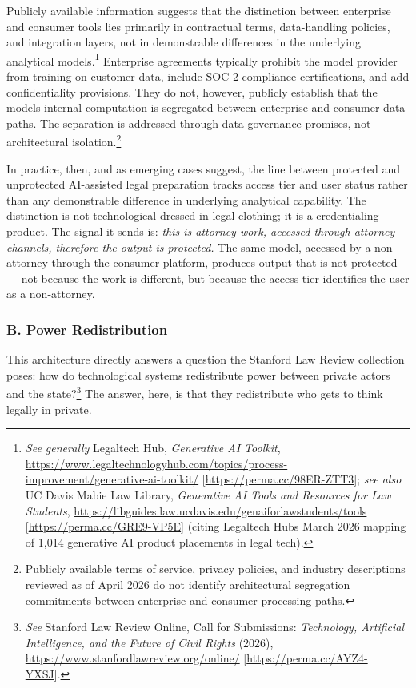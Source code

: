\documentclass[
  12pt,
]{article}
\begin{document}
Publicly available information suggests that the distinction between
enterprise and consumer tools lies primarily in contractual terms, data-handling
policies, and integration layers, not in demonstrable
differences in the underlying analytical models.\footnote{\emph{See
  generally} Legaltech Hub, \emph{Generative AI Toolkit},
  \url{https://www.legaltechnologyhub.com/topics/process-improvement/generative-ai-toolkit/}
  {[}\url{https://perma.cc/98ER-ZTT3}{]}; \emph{see also} UC Davis Mabie
  Law Library, \emph{Generative AI Tools and Resources for Law
  Students},
  \url{https://libguides.law.ucdavis.edu/genaiforlawstudents/tools}
  {[}\url{https://perma.cc/GRE9-VP5E}{]} (citing Legaltech
  Hub\textquotesingle s March 2026 mapping of 1,014 generative AI
  product placements in legal tech).} Enterprise agreements typically
prohibit the model provider from training on customer data, include SOC
2 compliance certifications, and add confidentiality provisions. They do
not, however, publicly establish that the model\textquotesingle s
internal computation is segregated between enterprise and consumer data
paths. The separation is addressed through data governance promises, not
architectural isolation.\footnote{Publicly available terms of service,
  privacy policies, and industry descriptions reviewed as of April 2026
  do not identify architectural segregation commitments between
  enterprise and consumer processing paths.}

In practice, then, and as emerging cases suggest, the line between
protected and unprotected AI-assisted legal preparation tracks access
tier and user status rather than any demonstrable difference in
underlying analytical capability. The distinction is not technological
dressed in legal clothing; it is a credentialing product. The signal it
sends is: \emph{this is attorney work, accessed through attorney
channels, therefore the output is protected.} The same model, accessed
by a non-attorney through the consumer platform, produces output that is
not protected --- not because the work is different, but because the
access tier identifies the user as a non-attorney.

\subsubsection{B. Power Redistribution}\label{b-power-redistribution}

This architecture directly answers a question the Stanford Law Review
collection poses: how do technological systems redistribute power
between private actors and the state?\footnote{\emph{See} Stanford Law
  Review Online, Call for Submissions: \emph{Technology, Artificial
  Intelligence, and the Future of Civil Rights} (2026),
  \url{https://www.stanfordlawreview.org/online/}
  {[}\url{https://perma.cc/AYZ4-YXSJ}{]}.} The answer, here, is that
they redistribute who gets to think legally in private.
\end{document}
